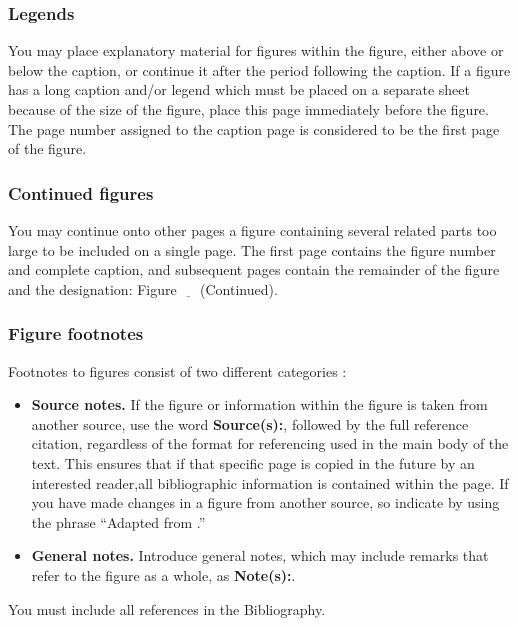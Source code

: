 \subsubsection{Legends}
\label{sec:Legends}

You may place explanatory material for figures within the figure,
either above or below the caption, or continue it after the period
following the caption. If a figure has a long caption and/or legend
which must be placed on a separate sheet because of the size of the
figure, place this page immediately before the figure. The page number
assigned to the caption page is considered to be the first page of the
figure.

\subsubsection{Continued figures}
\label{sec:ContinuedFigures}

You may continue onto other pages a figure containing several related
parts too large to be included on a single page. The first page
contains the figure number and complete caption, and subsequent pages
contain the remainder of the figure and the designation: Figure
$\underline{\quad}$ (Continued).

\subsubsection{Figure footnotes}
\label{sec:FigureFootnotes}

Footnotes to figures consist of two different categories
\cite{turabian1987}:
\begin{itemize}
\item \textbf{Source notes.} If the figure or information within the
  figure is taken from another source, use the word
  \textbf{Source(s):}, followed by the full reference citation,
  regardless of the format for referencing used in the main body of
  the text. This ensures that if that specific page is copied in the
  future by an interested reader,all bibliographic information is
  contained within the page.  If you have made changes in a figure
  from another source, so indicate by using the phrase ``Adapted from
  \textellipsis{}.''
\item \textbf{General notes.} Introduce general notes, which may
  include remarks that refer to the figure as a whole, as
  \textbf{Note(s):}.
\end{itemize}

You must include all references in the Bibliography. 

